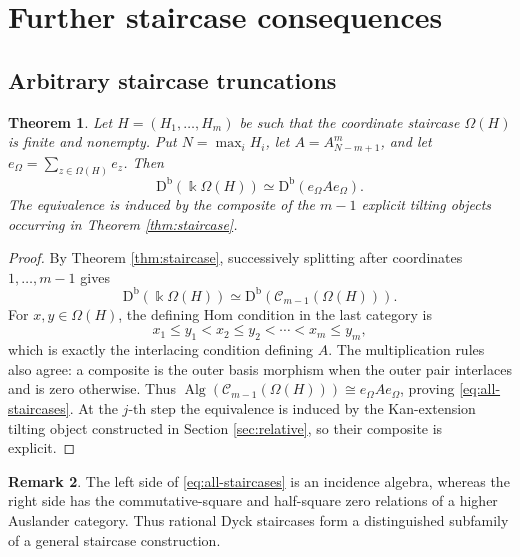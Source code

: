 \documentclass[12pt,a4paper,english,reqno]{amsart}
\theoremstyle{plain}
\newtheorem{theorem}{Theorem}[section]
\theoremstyle{definition}
\newtheorem{remark}[theorem]{Remark}
\newcommand{\kk}{\Bbbk}
\newcommand{\Db}{\mathrm D^{\mathrm b}}
\newcommand{\C}{\mathcal C}
\begin{document}
\section{Further staircase consequences}
\label{sec:staircase-consequences}

\subsection{Arbitrary staircase truncations}

\begin{theorem}
\label{thm:arbitrary-staircase-application}
Let $H=(H_1,\ldots,H_m)$ be such that the coordinate staircase
$\Omega(H)$ is finite and nonempty.  Put $N=\max_i H_i$, let
$A=A_{N-m+1}^{m}$, and let
$e_\Omega=\sum_{z\in\Omega(H)}e_z$.  Then
\begin{equation}
 \Db(\kk\Omega(H))
 \simeq\Db(e_{\Omega}Ae_{\Omega}).
\label{eq:all-staircases}
\end{equation}
The equivalence is induced by the composite of the $m-1$ explicit tilting
objects occurring in Theorem \ref{thm:staircase}.
\end{theorem}

\begin{proof}
By Theorem \ref{thm:staircase}, successively splitting after coordinates
$1,\ldots,m-1$ gives
\[
 \Db(\kk\Omega(H))
 \simeq\Db(\C_{m-1}(\Omega(H))).
\]
For $x,y\in\Omega(H)$, the defining Hom condition in the last category is
\[
 x_1\leq y_1<x_2\leq y_2<\cdots<x_m\leq y_m,
\]
which is exactly the interlacing condition defining $A$.  The
multiplication rules also agree: a composite is the outer basis morphism
when the outer pair interlaces and is zero otherwise.  Thus
$\operatorname{Alg}(\C_{m-1}(\Omega(H)))\cong e_\Omega Ae_\Omega$, proving
\eqref{eq:all-staircases}.  At the $j$-th step the equivalence is induced
by the Kan-extension tilting object constructed in Section \ref{sec:relative}, so
their composite is explicit.
\end{proof}

\begin{remark}
The left side of \eqref{eq:all-staircases} is an incidence algebra, whereas
the right side has the commutative-square and half-square zero relations of
a higher Auslander category.  Thus rational Dyck staircases form a
distinguished subfamily of a general staircase construction.
\end{remark}
\end{document}
